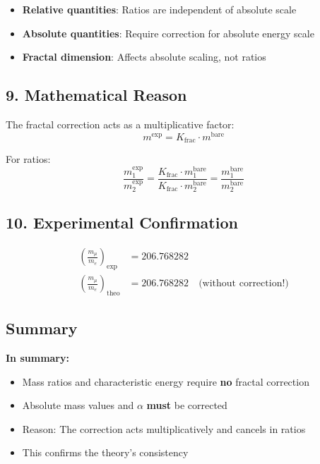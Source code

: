 \documentclass[12pt,a4paper]{article}
\begin{document}
	\begin{itemize}
		\item \textbf{Relative quantities}: Ratios are independent of absolute scale
		\item \textbf{Absolute quantities}: Require correction for absolute energy scale
		\item \textbf{Fractal dimension}: Affects absolute scaling, not ratios
	\end{itemize}
	
	\subsection*{9. Mathematical Reason}
	
	The fractal correction acts as a multiplicative factor:
	\[
	m^{\text{exp}} = K_{\text{frac}} \cdot m^{\text{bare}}
	\]
	
	For ratios:
	\[
	\frac{m_1^{\text{exp}}}{m_2^{\text{exp}}} = \frac{K_{\text{frac}} \cdot m_1^{\text{bare}}}{K_{\text{frac}} \cdot m_2^{\text{bare}}} = \frac{m_1^{\text{bare}}}{m_2^{\text{bare}}}
	\]
	
	\subsection*{10. Experimental Confirmation}
	
	\begin{align*}
		\left(\frac{m_\mu}{m_e}\right)_{\text{exp}} &= 206.768282 \\
		\left(\frac{m_\mu}{m_e}\right)_{\text{theo}} &= 206.768282 \quad \text{(without correction!)}
	\end{align*}
	
	\subsection*{Summary}
	
	\begin{tcolorbox}[colback=blue!5!white,colframe=blue!75!black]
		\textbf{In summary:}
		\begin{itemize}
			\item Mass ratios and characteristic energy require \textbf{no} fractal correction
			\item Absolute mass values and $\alpha$ \textbf{must} be corrected
			\item Reason: The correction acts multiplicatively and cancels in ratios
			\item This confirms the theory's consistency
		\end{itemize}
	\end{tcolorbox}
	
\end{document}
